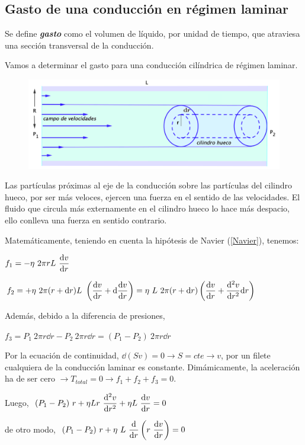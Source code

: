 \subsection{Gasto de una conducción en régimen laminar}

Se define \emph{\textbf{gasto}} como el volumen de líquido, por unidad de tiempo, que atraviesa una sección transversal de la conducción.

Vamos a determinar el gasto para una conducción cilíndrica de régimen laminar.

\begin{figure}[H]
	\centering
	\includegraphics[width=1\textwidth]{imagenes/imagenes18/T18IM14.png}
	\end{figure}

Las partículas próximas al eje de la conducción sobre las partículas del cilindro hueco, por ser más veloces, ejercen una fuerza en el sentido de las velocidades. El fluido que circula más externamente en el cilindro hueco lo hace más despacio, ello conlleva una fuerza en sentido contrario. 

Matemáticamente, teniendo en cuenta la hipótesis de Navier (\ref{Navier}), tenemos:

$\displaystyle f_1=-\eta \ 2\pi r L \ \dv{v}{r}$

$\displaystyle f_2=+\eta \ 2\pi(r+\dd r)L \ \left( \dv{v}{r} + \dd \dv{v}{r} \right) = \eta \ L\ 2\pi (r+\dd r) \left( \dv{v}{r} +  \dv[2]{v}{r} \dd r \right)$

Además, debido a la diferencia de presiones,

$f_3=P_1\ 2\pi r \dd r -P_2\ 2\pi r \dd r= (P_1-P_2) \ 2 \pi r \dd r$

Por la ecuación de continuidad, $\dd (Sv)=0 \to S=cte \to v$, por un filete cualquiera de la conducción laminar es constante. Dimámicamente, la aceleración ha de ser cero $\to T_{total}=0 \to f_1+f_2+f_3=0$.

Luego, $\displaystyle \ (P_1-P_2)\ r + \eta L r \ \dv[2]{v}{r}+ \eta L \ \dv{v}{r}=0$

de otro modo, $\ \displaystyle (P_1-P_2) \ r + \eta \ L \ \dv{r} \left( r\ \dv{v}{r} \right) = 0$

